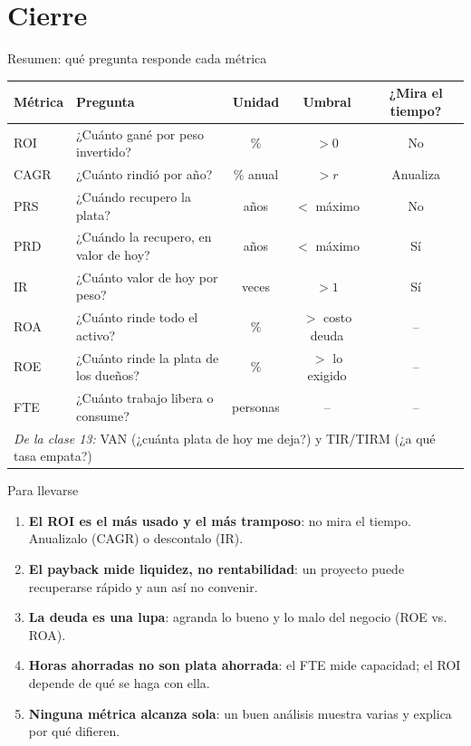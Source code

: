 \documentclass[aspectratio=169,10pt]{beamer}
\begin{document}
\section{Cierre}

\begin{frame}{Resumen: qué pregunta responde cada métrica}
\small
\begin{center}
\begin{tabular}{llccc}
\toprule
\textbf{Métrica} & \textbf{Pregunta} & \textbf{Unidad} & \textbf{Umbral} & \textbf{¿Mira el tiempo?} \\
\midrule
ROI         & ¿Cuánto gané por peso invertido?        & \%      & $> 0$ & No \\
CAGR        & ¿Cuánto rindió por año?                 & \% anual & $> r$ & Anualiza \\
PRS         & ¿Cuándo recupero la plata?              & años    & $<$ máximo & No \\
PRD         & ¿Cuándo la recupero, en valor de hoy?   & años    & $<$ máximo & Sí \\
IR          & ¿Cuánto valor de hoy por peso?          & veces   & $> 1$ & Sí \\
ROA         & ¿Cuánto rinde todo el activo?           & \%      & $>$ costo deuda & -- \\
ROE         & ¿Cuánto rinde la plata de los dueños?   & \%      & $>$ lo exigido & -- \\
FTE         & ¿Cuánto trabajo libera o consume?       & personas & -- & -- \\
\midrule
\multicolumn{5}{l}{\emph{De la clase 13:} VAN (¿cuánta plata de hoy me deja?) y TIR/TIRM (¿a qué tasa empata?)} \\
\bottomrule
\end{tabular}
\end{center}
\end{frame}

\begin{frame}{Para llevarse}
\begin{enumerate}
  \item \textbf{El ROI es el más usado y el más tramposo}: no mira el tiempo.
        Anualizalo (CAGR) o descontalo (IR).
  \item \textbf{El payback mide liquidez, no rentabilidad}: un proyecto puede recuperarse rápido
        y aun así no convenir.
  \item \textbf{La deuda es una lupa}: agranda lo bueno y lo malo del negocio (ROE vs. ROA).
  \item \textbf{Horas ahorradas no son plata ahorrada}: el FTE mide capacidad; el ROI depende de
        qué se haga con ella.
  \item \textbf{Ninguna métrica alcanza sola}: un buen análisis muestra varias y explica por qué
        difieren.
\end{enumerate}
\end{frame}
\end{document}
